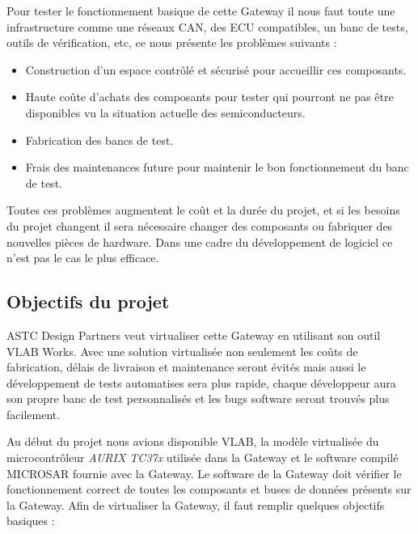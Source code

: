 Pour tester le fonctionnement basique de cette Gateway il nous faut toute une infrastructure comme une réseaux CAN, des ECU compatibles, un banc de tests, outils de vérification, etc, ce nous présente les problèmes suivants : 

\begin{itemize} 

    \item Construction d'un espace contrôlé et sécurisé pour accueillir ces composants. 

    \item Haute coûte d'achats des composants pour tester qui pourront ne pas être disponibles vu la situation actuelle des semiconducteurs. 

    \item Fabrication des bancs de test. 

    \item Frais des maintenances future pour maintenir le bon fonctionnement du banc de test.   

\end{itemize} 

Toutes ces problèmes augmentent le co\^ut et la durée du projet, et si les besoins du projet changent il sera nécessaire changer des composants ou fabriquer des nouvelles pièces de hardware. Dans une cadre du développement de logiciel ce n'est pas le cas le plus efficace. 

\subsection{Objectifs du projet} 

  

ASTC Design Partners veut virtualiser cette Gateway en utilisant son outil VLAB Works. Avec une solution virtualis\'ee non seulement les coûts de fabrication, délais de livraison et maintenance seront évités mais aussi le développement de tests automatises sera plus rapide, chaque développeur aura son propre banc de test personnalisés et les bugs software seront trouvés plus facilement.  

Au début du projet nous avions disponible VLAB, la modèle virtualis\'ee du microcontrôleur \textit{AURIX TC37x} utilisée dans la Gateway et le software compil\'e MICROSAR fournie avec la Gateway. Le software de la Gateway doit vérifier le fonctionnement correct de toutes les composants et buses de données présents sur la Gateway. Afin de virtualiser la Gateway, il faut remplir quelques objectifs basiques :  

